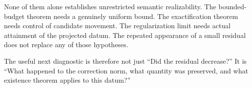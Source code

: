 None of them alone establishes unrestricted semantic realizability. The bounded-budget theorem needs a genuinely uniform bound. The exactification theorem needs control of candidate movement. The regularization limit needs actual attainment of the projected datum. The repeated appearance of a small residual does not replace any of those hypotheses.

The useful next diagnostic is therefore not just ``Did the residual decrease?'' It is ``What happened to the correction norm, what quantity was preserved, and what existence theorem applies to this datum?''
